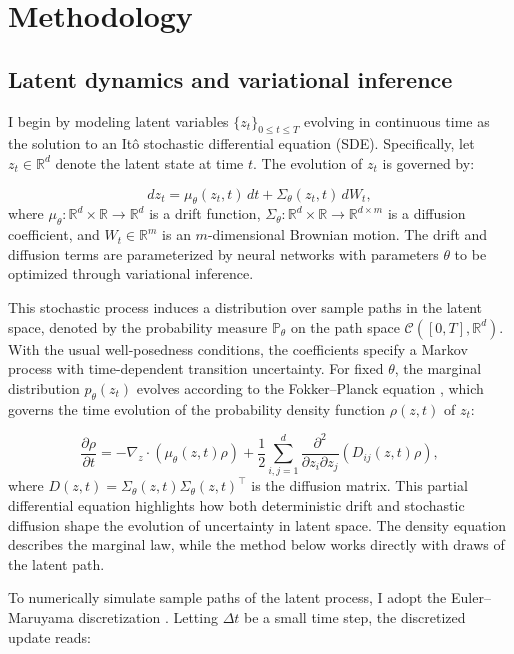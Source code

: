 \documentclass[12pt]{article}
\begin{document}
\section*{Methodology}

\subsection*{Latent dynamics and variational inference}

I begin by modeling latent variables $\{z_t\}_{0\leq t\leq T}$ evolving in continuous time as the solution to an It\^o stochastic differential equation (SDE). Specifically, let $z_t \in \mathbb{R}^d$ denote the latent state at time $t$. The evolution of $z_t$ is governed by:

\[
dz_t = \mu_\theta(z_t, t)\,dt + \Sigma_\theta(z_t, t)\,dW_t,
\]
where $\mu_\theta : \mathbb{R}^d \times \mathbb{R} \rightarrow \mathbb{R}^d$ is a drift function, $\Sigma_\theta : \mathbb{R}^d \times \mathbb{R} \rightarrow \mathbb{R}^{d \times m}$ is a diffusion coefficient, and $W_t \in \mathbb{R}^m$ is an $m$-dimensional Brownian motion. The drift and diffusion terms are parameterized by neural networks with parameters $\theta$ to be optimized through variational inference.

This stochastic process induces a distribution over sample paths in the latent space, denoted by the probability measure $\mathbb{P}_\theta$ on the path space $\mathcal{C}([0,T], \mathbb{R}^d)$. With the usual well-posedness conditions, the coefficients specify a Markov process with time-dependent transition uncertainty. For fixed $\theta$, the marginal distribution $p_\theta(z_t)$ evolves according to the Fokker--Planck equation \citep{sarkka2019applied}, which governs the time evolution of the probability density function $\rho(z, t)$ of $z_t$:

\[
\frac{\partial \rho}{\partial t} = -\nabla_z \cdot (\mu_\theta(z, t) \rho) + \frac{1}{2} \sum_{i,j=1}^d \frac{\partial^2}{\partial z_i \partial z_j} \left( D_{ij}(z, t) \rho \right),
\]
where $D(z, t) = \Sigma_\theta(z, t) \Sigma_\theta(z, t)^\top$ is the diffusion matrix. This partial differential equation highlights how both deterministic drift and stochastic diffusion shape the evolution of uncertainty in latent space. The density equation describes the marginal law, while the method below works directly with draws of the latent path.

To numerically simulate sample paths of the latent process, I adopt the Euler--Maruyama discretization \citep{kloeden1992numerical}. Letting $\Delta t$ be a small time step, the discretized update reads:
\end{document}
